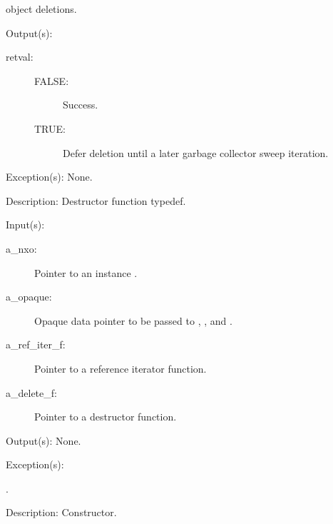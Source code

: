 \begin{capi}
\begin{capilist}
\begin{description}
			object deletions.
		\end{description}
	\item[Output(s): ]
		\begin{description}\item[]
		\item[retval: ]
			\begin{description}\item[]
			\item[FALSE: ] Success.
			\item[TRUE: ] Defer deletion until a later garbage
			collector sweep iteration.
			\end{description}
		\end{description}
	\item[Exception(s): ] None.
	\item[Description: ]
		Destructor function typedef.
	\end{capilist}
\label{nxo_instance_new}
	\begin{capilist}
	\item[Input(s): ]
		\begin{description}\item[]
		\item[a\_nxo: ]
			Pointer to an instance .
		\item[a\_opaque: ]
			Opaque data pointer to be passed to ,
			, and .
		\item[a\_ref\_iter\_f: ]
			Pointer to a reference iterator function.
		\item[a\_delete\_f: ]
			Pointer to a destructor function.
		\end{description}
	\item[Output(s): ] None.
	\item[Exception(s): ]
		\begin{description}\item[]
		\item[.]
		\end{description}
	\item[Description: ]
		Constructor.
	\end{capilist}
\label{nxo_instance_isa_get}

\end{capi}
